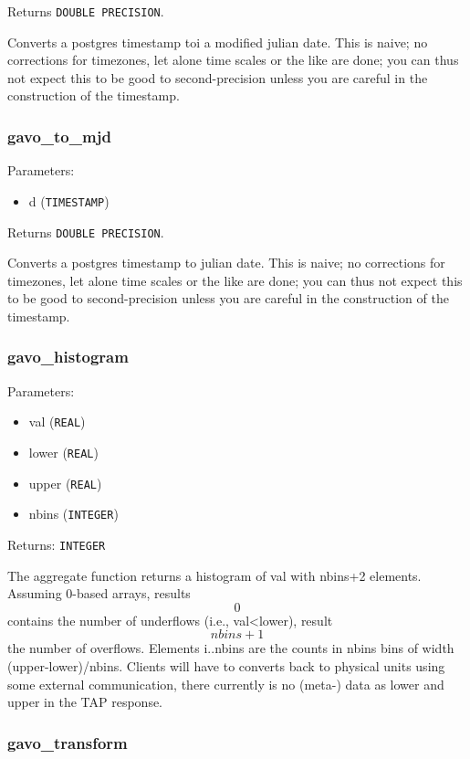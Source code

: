 \documentclass[11pt,a4paper]{ivoa}
\begin{document}
Returns \texttt{DOUBLE PRECISION}.

Converts a postgres timestamp toi a modified julian date. This is naive;
no corrections for timezones, let alone time scales or the like are done;
you can thus not expect this to be good to second-precision unless you
are careful in the construction of the timestamp.

\subsubsection{gavo\_to\_mjd}

Parameters:

\begin{itemize}
	\item d (\texttt{TIMESTAMP})
\end{itemize}

Returns \texttt{DOUBLE PRECISION}.

Converts a postgres timestamp to julian date. This is naive; no
corrections for timezones, let alone time scales or the like are done;
you can thus not expect this to be good to second-precision unless you
are careful in the construction of the timestamp.

\subsubsection{gavo\_histogram}

Parameters:

\begin{itemize}
	\item val (\texttt{REAL})
	\item lower (\texttt{REAL})
	\item upper (\texttt{REAL})
	\item nbins (\texttt{INTEGER})
\end{itemize}

Returns: \texttt{INTEGER\[\]}

The aggregate function returns a histogram of val with nbins+2 elements.
Assuming 0-based arrays, results\[0\] contains the number of underflows
(i.e., val<lower), result\[nbins+1\] the number of overflows. Elements
i..nbins are the counts in nbins bins of width (upper-lower)/nbins.
Clients will have to converts back to physical units using some external
communication, there currently is no (meta-) data as lower and upper in
the TAP response.

\subsubsection{gavo\_transform}
\end{document}

